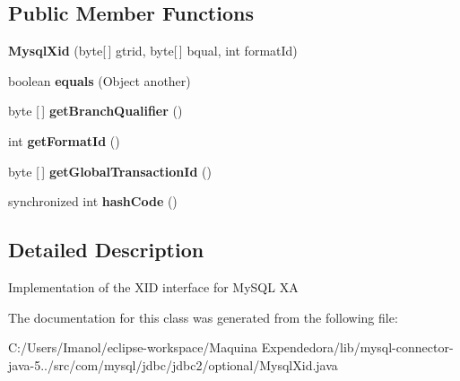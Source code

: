 \subsection*{Public Member Functions}
\begin{DoxyCompactItemize}
\item 
\mbox{\label{classcom_1_1mysql_1_1jdbc_1_1jdbc2_1_1optional_1_1_mysql_xid_a2a04fa6d6b4880eacc0665ee40bf38dc}} 
{\bfseries Mysql\+Xid} (byte\mbox{[}$\,$\mbox{]} gtrid, byte\mbox{[}$\,$\mbox{]} bqual, int format\+Id)
\item 
\mbox{\label{classcom_1_1mysql_1_1jdbc_1_1jdbc2_1_1optional_1_1_mysql_xid_a903026e779c9afa81b3797b49696d1fb}} 
boolean {\bfseries equals} (Object another)
\item 
\mbox{\label{classcom_1_1mysql_1_1jdbc_1_1jdbc2_1_1optional_1_1_mysql_xid_ac8a691eaaa1dcad2ce5720b33ec61627}} 
byte \mbox{[}$\,$\mbox{]} {\bfseries get\+Branch\+Qualifier} ()
\item 
\mbox{\label{classcom_1_1mysql_1_1jdbc_1_1jdbc2_1_1optional_1_1_mysql_xid_ad2851393aec082c4b801a9d4c9b609ff}} 
int {\bfseries get\+Format\+Id} ()
\item 
\mbox{\label{classcom_1_1mysql_1_1jdbc_1_1jdbc2_1_1optional_1_1_mysql_xid_a234a838e6a360efb5acb58342ef47434}} 
byte \mbox{[}$\,$\mbox{]} {\bfseries get\+Global\+Transaction\+Id} ()
\item 
\mbox{\label{classcom_1_1mysql_1_1jdbc_1_1jdbc2_1_1optional_1_1_mysql_xid_a6a09ac6ddc6080e989e94ea12c9d05d6}} 
synchronized int {\bfseries hash\+Code} ()
\end{DoxyCompactItemize}


\subsection{Detailed Description}
Implementation of the X\+ID interface for My\+S\+QL XA 

The documentation for this class was generated from the following file\+:\begin{DoxyCompactItemize}
\item 
C\+:/\+Users/\+Imanol/eclipse-\/workspace/\+Maquina Expendedora/lib/mysql-\/connector-\/java-\/5../src/com/mysql/jdbc/jdbc2/optional/Mysql\+Xid.\+java\end{DoxyCompactItemize}
